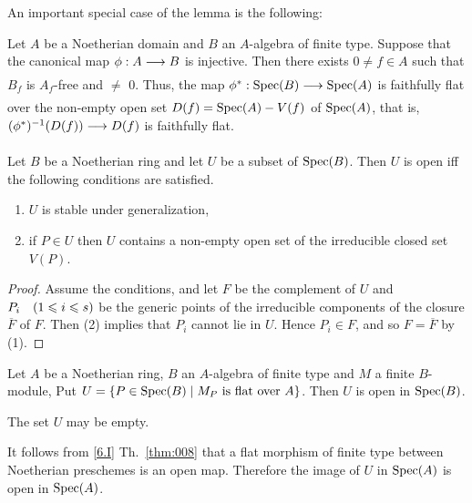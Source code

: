 \documentclass[../main]{subfiles}
\begin{document}
An important special case of the lemma is the following:
\begin{theorem}
\label{thm:052}
    Let $A$ be a Noetherian domain and $B$ an $A$-algebra of finite type. Suppose that the canonical map $\phi: A\varrightarrow{} B$ is injective. Then there exists $0 \neq f \in A$ such that $B_f$ is $A_f$-free and $\neq$ 0. Thus, the map \newline $\SpecInduced{\phi}: \Spec(B)\varrightarrow{}\Spec(A)$ is faithfully flat over the non-empty open set \newline $D(f) = \operatorname{Spec}(A) - V(f)$ of $\operatorname{Spec}(A)$, that is, $(\SpecInduced{\phi})^{-1}(D(f)) \varrightarrow{} D(f)$ is faithfully flat. 
\end{theorem}

\begin{parlemma}
\label{lem:22.02}
    Let $B$ be a Noetherian ring and let $U$ be a subset of $\operatorname{Spec}(B)$. Then $U$ is open iff the following conditions are satisfied.
    \begin{enumerate}[label=(\arabic*)]
    \item $U$ is stable under generalization,
    \item if $P \in U$ then $U$ contains a non-empty open set of the irreducible closed set $V(P)$.
    \end{enumerate}
\end{parlemma}
\begin{proof}
    Assume the conditions, and let $F$ be the complement of $U$ and \newline $P_i\for{1\le i\le s}$ be the generic points of the irreducible components of the closure $\overline{F}$ of $F$. Then (2) implies that $P_i$ cannot lie in $U$. Hence $P_i \in F$, and so $F=\overline{F}$ by (1). 
\end{proof}
\begin{theorem}
\label{thm:053}
    Let $A$ be a Noetherian ring, $B$ an $A$-algebra of finite type and $M$ a finite $B$-module, Put $U = \left\{P \in \operatorname{Spec}(B) \mid M_P \text{ is flat over } A\right\}$. Then $U$ is open in $\operatorname{Spec}(B)$. 
\end{theorem}
\begin{remark}
\label{rem:22.01}
    The set $U$ may be empty.
\end{remark}
\begin{remark}
\label{rem:22.02}
    It follows from \ref{6.I} Th.~\ref{thm:008} that a flat morphism of finite type between Noetherian preschemes is an open map. Therefore the image of $U$ in $\operatorname{Spec}(A)$ is open in $\operatorname{Spec}(A)$. 
\end{remark}
\end{document}
